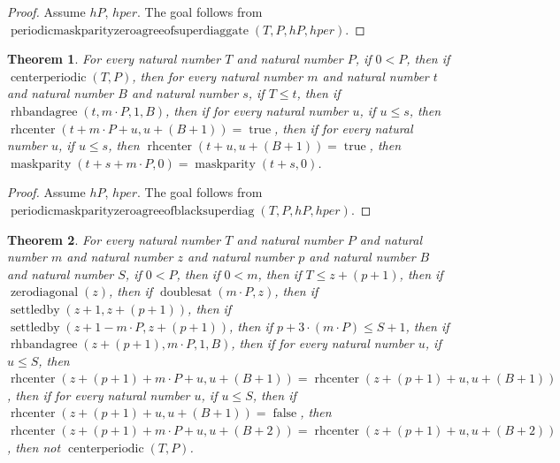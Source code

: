 \documentclass[11pt]{article}
\newtheorem{theorem}{Theorem}[section]
\theoremstyle{definition}
\begin{document}
\begin{proof}
Assume \(hP\), \(hper\).
The goal follows from \(\operatorname{periodicmaskparityzeroagreeofsuperdiaggate}(T, P, hP, hper)\).
\end{proof}
\begin{theorem}
\label{ll:paper:periodic-maskparity-zero-agree-of-black-superdiag}
For every natural number \(T\) and natural number \(P\), if \(0 < P\), then if \(\operatorname{centerperiodic}(T, P)\), then for every natural number \(m\) and natural number \(t\) and natural number \(B\) and natural number \(s\), if \(T \le t\), then if \(\operatorname{rhbandagree}(t, m \cdot P, 1, B)\), then if for every natural number \(u\), if \(u \le s\), then \(\operatorname{rhcenter}(t + m \cdot P + u, u + (B + 1)) = \operatorname{true}\), then if for every natural number \(u\), if \(u \le s\), then \(\operatorname{rhcenter}(t + u, u + (B + 1)) = \operatorname{true}\), then \(\operatorname{maskparity}(t + s + m \cdot P, 0) = \operatorname{maskparity}(t + s, 0)\).
\end{theorem}
\begin{proof}
Assume \(hP\), \(hper\).
The goal follows from \(\operatorname{periodicmaskparityzeroagreeofblacksuperdiag}(T, P, hP, hper)\).
\end{proof}
\begin{theorem}
\label{ll:paper:not-centerperiodic-of-superdiag-gate-at-zero-diag}
For every natural number \(T\) and natural number \(P\) and natural number \(m\) and natural number \(z\) and natural number \(p\) and natural number \(B\) and natural number \(S\), if \(0 < P\), then if \(0 < m\), then if \(T \le z + (p + 1)\), then if \(\operatorname{zerodiagonal}(z)\), then if \(\operatorname{doublesat}(m \cdot P, z)\), then if \(\operatorname{settledby}(z + 1, z + (p + 1))\), then if \(\operatorname{settledby}(z + 1 - m \cdot P, z + (p + 1))\), then if \(p + 3 \cdot (m \cdot P) \le S + 1\), then if \(\operatorname{rhbandagree}(z + (p + 1), m \cdot P, 1, B)\), then if for every natural number \(u\), if \(u \le S\), then \(\operatorname{rhcenter}(z + (p + 1) + m \cdot P + u, u + (B + 1)) = \operatorname{rhcenter}(z + (p + 1) + u, u + (B + 1))\), then if for every natural number \(u\), if \(u \le S\), then if \(\operatorname{rhcenter}(z + (p + 1) + u, u + (B + 1)) = \operatorname{false}\), then \(\operatorname{rhcenter}(z + (p + 1) + m \cdot P + u, u + (B + 2)) = \operatorname{rhcenter}(z + (p + 1) + u, u + (B + 2))\), then not \(\operatorname{centerperiodic}(T, P)\).
\end{theorem}
\end{document}
